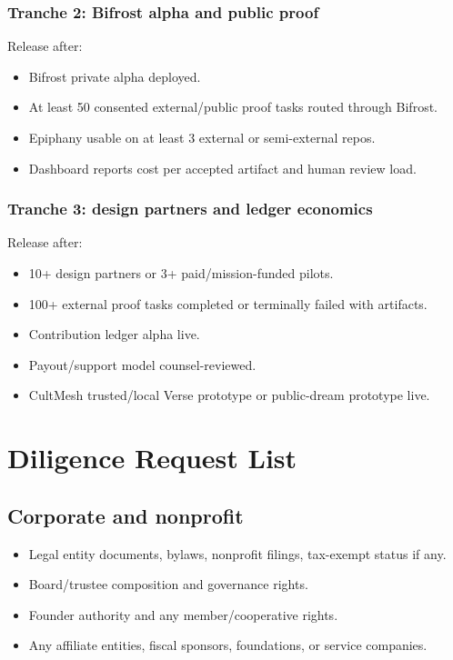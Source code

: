 \documentclass[11pt,oneside]{report}
\begin{document}
\subsection{Tranche 2: Bifrost alpha and public proof}

Release after:

\begin{itemize}
  \item Bifrost private alpha deployed.
  \item At least 50 consented external/public proof tasks routed through Bifrost.
  \item Epiphany usable on at least 3 external or semi-external repos.
  \item Dashboard reports cost per accepted artifact and human review load.
\end{itemize}

\subsection{Tranche 3: design partners and ledger economics}

Release after:

\begin{itemize}
  \item 10+ design partners or 3+ paid/mission-funded pilots.
  \item 100+ external proof tasks completed or terminally failed with artifacts.
  \item Contribution ledger alpha live.
  \item Payout/support model counsel-reviewed.
  \item CultMesh trusted/local Verse prototype or public-dream prototype live.
\end{itemize}

\chapter{Diligence Request List}

\section{Corporate and nonprofit}

\begin{itemize}
  \item Legal entity documents, bylaws, nonprofit filings, tax-exempt status if any.
  \item Board/trustee composition and governance rights.
  \item Founder authority and any member/cooperative rights.
  \item Any affiliate entities, fiscal sponsors, foundations, or service companies.
\end{itemize}
\end{document}
